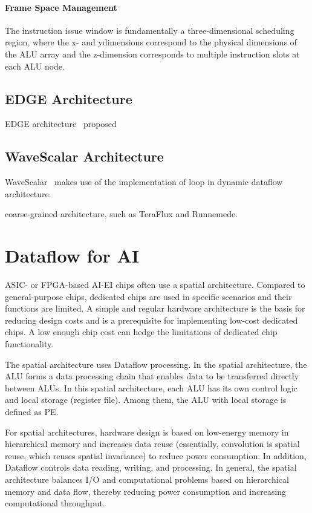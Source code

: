 \documentclass[UTF8,12pt,a4paper]{article}
\begin{document}
\paragraph{Frame Space Management}
The instruction issue window is fundamentally a three-dimensional scheduling region,
where the x- and ydimensions correspond to the physical dimensions of the ALU array
and the z-dimension corresponds to multiple instruction slots at each ALU node.

\subsection{EDGE Architecture}

EDGE architecture~\cite{DBLP:journals/computer/BurgerKMDJLMBMY04} proposed

\subsection{WaveScalar Architecture}

WaveScalar~\cite{DBLP:conf/micro/SwansonMSO03}\cite{DBLP:journals/tocs/SwansonSMPPMOE07}
makes use of the implementation of loop in dynamic dataflow architecture.

coarse-grained architecture, such as TeraFlux and Runnemede.

\clearpage

\section{Dataflow for AI}

ASIC- or FPGA-based AI-EI chips often use a spatial architecture.
Compared to general-purpose chips, dedicated chips are used
in specific scenarios and their functions are limited.
A simple and regular hardware architecture is the basis for reducing design costs
and is a prerequisite for implementing low-cost dedicated chips.
A low enough chip cost can hedge the limitations of dedicated chip functionality.

The spatial architecture uses Dataflow processing.
In the spatial architecture, the ALU forms a data processing chain
that enables data to be transferred directly between ALUs.
In this spatial architecture, each ALU has its own control logic and local storage (register file).
Among them, the ALU with local storage is defined as PE.

For spatial architectures, hardware design is based on
low-energy memory in hierarchical memory and increases data reuse
(essentially, convolution is spatial reuse, which reuses spatial invariance) to reduce power consumption.
In addition, Dataflow controls data reading, writing, and processing.
In general, the spatial architecture balances I/O and computational problems
based on hierarchical memory and data flow,
thereby reducing power consumption and increasing computational throughput.
\end{document}
